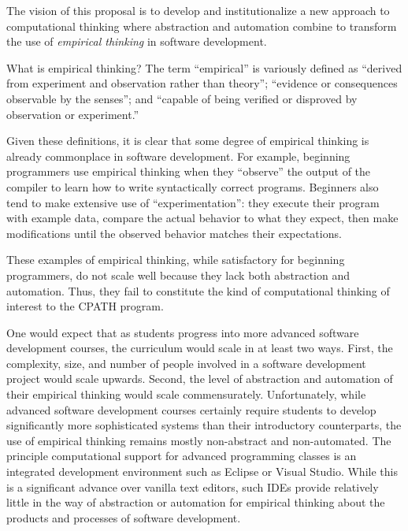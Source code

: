 The vision of this proposal is to develop and institutionalize a new
approach to computational thinking where abstraction and automation combine
to transform the use of {\em empirical thinking} in software development.

What is empirical thinking?  The term ``empirical'' is variously defined as
``derived from experiment and observation rather than theory''; ``evidence
or consequences observable by the senses''; and ``capable of being verified
or disproved by observation or experiment.''

Given these definitions, it is clear that some degree of empirical thinking
is already commonplace in software development.  For example, beginning
programmers use empirical thinking when they ``observe'' the output of the
compiler to learn how to write syntactically correct programs.  Beginners
also tend to make extensive use of ``experimentation'': they execute their
program with example data, compare the actual behavior to what they expect,
then make modifications until the observed behavior matches their
expectations.

These examples of empirical thinking, while satisfactory for beginning
programmers, do not scale well because they lack both abstraction and
automation. Thus, they fail to constitute the kind of computational
thinking of interest to the CPATH program.

One would expect that as students progress into more advanced software
development courses, the curriculum would scale in at least two
ways. First, the complexity, size, and number of people involved in a
software development project would scale upwards.  Second, the level of
abstraction and automation of their empirical thinking would scale
commensurately. Unfortunately, while advanced software development courses
certainly require students to develop significantly more sophisticated
systems than their introductory counterparts, the use of empirical thinking
remains mostly non-abstract and non-automated.  The principle computational
support for advanced programming classes is an integrated development
environment such as Eclipse or Visual Studio. While this is a significant
advance over vanilla text editors, such IDEs provide relatively little in
the way of abstraction or automation for empirical thinking about the
products and processes of software development.

